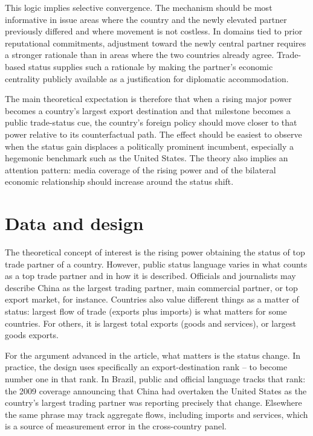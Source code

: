 \documentclass[
  12pt,
]{article}
\begin{document}
This logic implies selective convergence. The mechanism should be most informative in issue areas where the country and the newly elevated partner previously differed and where movement is not costless. In domains tied to prior reputational commitments, adjustment toward the newly central partner requires a stronger rationale than in areas where the two countries already agree. Trade-based status supplies such a rationale by making the partner's economic centrality publicly available as a justification for diplomatic accommodation.

The main theoretical expectation is therefore that when a rising major power becomes a country's largest export destination and that milestone becomes a public trade-status cue, the country's foreign policy should move closer to that power relative to its counterfactual path. The effect should be easiest to observe when the status gain displaces a politically prominent incumbent, especially a hegemonic benchmark such as the United States. The theory also implies an attention pattern: media coverage of the rising power and of the bilateral economic relationship should increase around the status shift.

\section{Data and design}\label{data-and-design}

The theoretical concept of interest is the rising power obtaining the status of top trade partner of a country. However, public status language varies in what counts as a top trade partner and in how it is described. Officials and journalists may describe China as the largest trading partner, main commercial partner, or top export market, for instance. Countries also value different things as a matter of status: largest flow of trade (exports plus imports) is what matters for some countries. For others, it is largest total exports (goods and services), or largest goods exports.

For the argument advanced in the article, what matters is the status change. In practice, the design uses specifically an export-destination rank -- to become number one in that rank. In Brazil, public and official language tracks that rank: the 2009 coverage announcing that China had overtaken the United States as the country's largest trading partner was reporting precisely that change. Elsewhere the same phrase may track aggregate flows, including imports and services, which is a source of measurement error in the cross-country panel.
\end{document}
